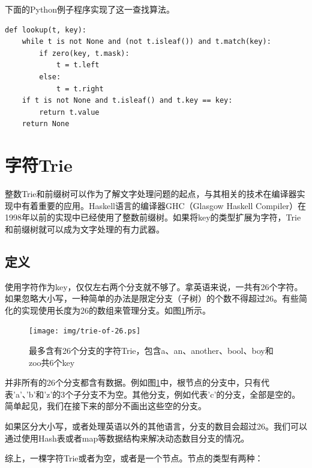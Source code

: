 \documentclass[b5paper]{ctexart}
\begin{document}
下面的Python例子程序实现了这一查找算法。

\lstset{language=Python}
\begin{lstlisting}
def lookup(t, key):
    while t is not None and (not t.isleaf()) and t.match(key):
        if zero(key, t.mask):
            t = t.left
        else:
            t = t.right
    if t is not None and t.isleaf() and t.key == key:
        return t.value
    return None
\end{lstlisting}


\section{字符Trie}

整数Trie和前缀树可以作为了解文字处理问题的起点，与其相关的技术在编译器实现中有着重要的应用。Haskell语言的编译器GHC（Glasgow Haskell Compiler）在1998年以前的实现中已经使用了整数前缀树\cite{okasaki-int-map}。如果将key的类型扩展为字符，Trie和前缀树就可以成为文字处理的有力武器。

\subsection{定义}
使用字符作为key，仅仅左右两个分支就不够了。拿英语来说，一共有26个字符。如果忽略大小写，一种简单的办法是限定分支（子树）的个数不得超过26。有些简化的实现使用长度为26的数组来管理分支。如图\ref{fig:trie-of-26}所示。

\begin{figure}[htbp]
  \centering
  \texttt{[image: img/trie-of-26.ps]}
  \caption{最多含有26个分支的字符Trie，包含a、an、another、bool、boy和zoo共6个key}
  \label{fig:trie-of-26}
\end{figure}

并非所有的26个分支都含有数据。例如图\ref{fig:trie-of-26}中，根节点的分支中，只有代表'a'、'b'和'z'的3个子分支不为空。其他分支，例如代表'c'的分支，全部是空的。简单起见，我们在接下来的部分不画出这些空的分支。

如果区分大小写，或者处理英语以外的其他语言，分支的数目会超过26。我们可以通过使用Hash表或者map等数据结构来解决动态数目分支的情况。

综上，一棵字符Trie或者为空，或者是一个节点。节点的类型有两种：
\end{document}
